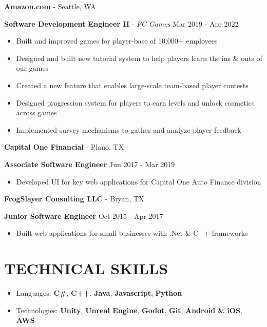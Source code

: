 \documentclass[resmargin,10pt]{res} %
\begin{document}
\begin{resume}
\begin{itemize}
    \end{itemize}
    {\bf Amazon.com} - Seattle, WA \\
    \begin{ncolumn}{1}
        {\bf Software Development Engineer II} - \textit{FC Games}  \hfill Mar 2019 - Apr 2022
    \end{ncolumn}
    \begin{itemize}
        \setlength\itemsep{-0.1em}
        \item Built and improved games for player-base of 10,000+ employees
        \item Designed and built new tutorial system to help players learn the ins \& outs of our games
        \item Created a new feature that enables large-scale team-based player contests
        \item Designed progression system for players to earn levels and unlock cosmetics across games
        \item Implemented survey mechanisms to gather and analyze player feedback
    \end{itemize}
    {\bf Capital One Financial} - Plano, TX \\
    \begin{ncolumn}{1}
        {\bf Associate Software Engineer} \hfill Jun 2017 - Mar 2019
    \end{ncolumn}
    \begin{itemize}
        \item Developed UI for key web applications for Capital One Auto Finance division
    \end{itemize}
    {\bf FrogSlayer Consulting LLC} - Bryan, TX \\
    \begin{ncolumn}{1}
        {\bf Junior Software Engineer} \hfill Oct 2015 - Apr 2017
    \end{ncolumn}
    \begin{itemize}
        \setlength\itemsep{-0.0em}
        \item  Built web applications for small businesses with .Net \& C++ frameworks
    \end{itemize}

    \section{TECHNICAL SKILLS}
    \begin{itemize}
        \setlength\itemsep{0.1em}
        \item[] {\large Languages:} \textbf{C\#}, \textbf{C++}, \textbf{Java}, \textbf{Javascript}, \textbf{Python}
        \item[] {\large Technologies:} \textbf{Unity}, \textbf{Unreal Engine}, \textbf{Godot}, \textbf{Git}, \textbf{Android \& iOS}, \textbf{AWS}
    \end{itemize}

\end{resume}
\end{document}
